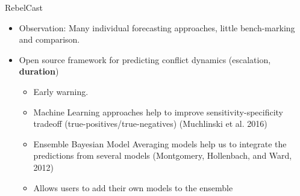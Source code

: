 \documentclass{beamer}
\begin{document}







%
%
%      

\begin{frame}{RebelCast}
\begin{itemize}
\item Observation: Many individual forecasting approaches, little bench-marking and comparison.
\item Open source framework for predicting conflict dynamics (escalation, \textbf{duration})
\begin{itemize}
\item Early warning.
\item Machine Learning approaches help to improve sensitivity-specificity tradeoff (true-positives/true-negatives) (Muchlinski et al. 2016)
\item Ensemble Bayesian Model Averaging models help us to integrate the predictions from several models (Montgomery, Hollenbach, and Ward, 2012)
\item Allows users to add their own models to the ensemble 
\end{itemize}
\end{itemize}
\end{frame}
\end{document}
